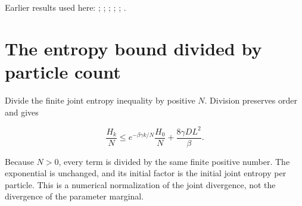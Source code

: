 \documentclass[11pt,a4paper]{article}
\begin{document}
Earlier results used here: \cite[Section~3.1.3]{LangevinLean2026ULALSI}; \cite[Section~3.29.7]{LangevinLean2026ULALSI}; \cite[Section~3.1.1]{LangevinLean2026IPLA}; \cite[Section~3.1.3]{LangevinLean2026IPLA}; \cite[Section~3.1.4]{LangevinLean2026IPLA}; \cite[Section~3.3.2]{LangevinLean2026IPLA}.

\section{\texorpdfstring{The entropy bound divided by particle count}{The entropy bound divided by particle count}}


Divide the finite joint entropy inequality by positive \(N\). Division preserves order and gives

\[\frac{H_k}{N}\le e^{-\beta\gamma k/N}\frac{H_0}{N}+\frac{8\gamma D L^2}{\beta}.\]

Because \(N>0\), every term is divided by the same finite positive number. The exponential is unchanged, and its initial factor is the initial joint entropy per particle. This is a numerical normalization of the joint divergence, not the divergence of the parameter marginal.
\end{document}
